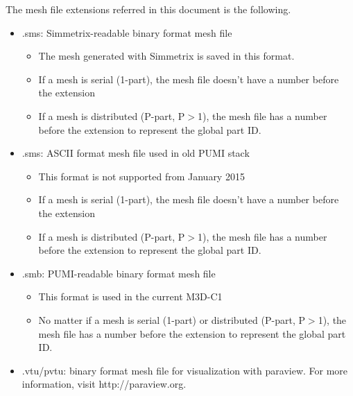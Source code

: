The mesh file extensions referred in this document is the following.
\begin{itemize}
\item	.sms: Simmetrix-readable binary format mesh file
\begin{itemize}
\item	The mesh generated with Simmetrix is saved in this format.
\item	If a mesh is serial (1-part), the mesh file doesn’t have a number before the extension
\item	If a mesh is distributed (P-part, P$>$1), the mesh file has a number before the extension to represent the global part ID.
\end{itemize}
\item	.sms: ASCII format mesh file used in old PUMI stack
\begin{itemize}
\item	This format is not supported from January 2015
\item	If a mesh is serial (1-part), the mesh file doesn’t have a number before the extension
\item	If a mesh is distributed (P-part, P$>$1), the mesh file has a number before the extension to represent the global part ID.
\end{itemize}
\item	.smb: PUMI-readable binary format mesh file
\begin{itemize}
\item	This format is used in the current M3D-C1
\item	No matter if a mesh is serial (1-part) or distributed (P-part, P$>$1), the mesh file has a number before the extension to represent the global part ID.
\end{itemize}
\item .vtu/pvtu: binary format mesh file for visualization with paraview. For more information, visit http://paraview.org.
\end{itemize}

